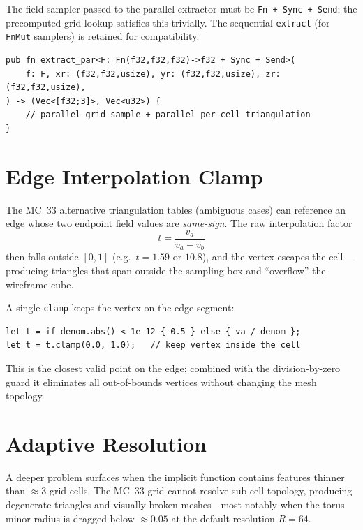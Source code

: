 \documentclass[11pt]{article}
\begin{document}
The field sampler passed to the parallel extractor must be
\texttt{Fn + Sync + Send}; the precomputed grid lookup satisfies
this trivially.  The sequential \texttt{extract} (for
\texttt{FnMut} samplers) is retained for compatibility.

\begin{lstlisting}
pub fn extract_par<F: Fn(f32,f32,f32)->f32 + Sync + Send>(
    f: F, xr: (f32,f32,usize), yr: (f32,f32,usize), zr: (f32,f32,usize),
) -> (Vec<[f32;3]>, Vec<u32>) {
    // parallel grid sample + parallel per-cell triangulation
}
\end{lstlisting}

\section{Edge Interpolation Clamp}

The MC~33 alternative triangulation tables (ambiguous cases) can
reference an edge whose two endpoint field values are
\emph{same-sign}.  The raw interpolation factor
\begin{equation}
  t = \frac{v_a}{v_a - v_b}
\end{equation}
then falls outside $[0,1]$ (e.g.\ $t = 1.59$ or $10.8$), and the
vertex escapes the cell---producing triangles that span outside
the sampling box and ``overflow'' the wireframe cube.

A single \texttt{clamp} keeps the vertex on the edge segment:
\begin{lstlisting}
let t = if denom.abs() < 1e-12 { 0.5 } else { va / denom };
let t = t.clamp(0.0, 1.0);   // keep vertex inside the cell
\end{lstlisting}
This is the closest valid point on the edge; combined with the
division-by-zero guard it eliminates all out-of-bounds vertices
without changing the mesh topology.

\section{Adaptive Resolution}

A deeper problem surfaces when the implicit function contains features
thinner than $\approx 3$ grid cells.  The MC~33 grid cannot resolve
sub-cell topology, producing degenerate triangles and visually broken
meshes---most notably when the torus minor radius is dragged below
$\approx 0.05$ at the default resolution $R=64$.
\end{document}
